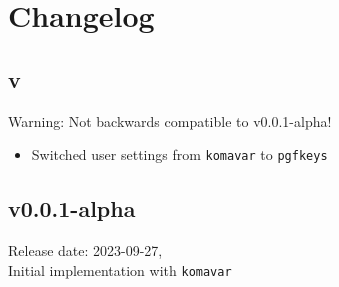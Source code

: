 \chapter{Changelog}
\section{v\releaseVersion}
Warning: Not backwards compatible to v0.0.1-alpha!
\begin{itemize}
	\item Switched user settings from \verb|komavar| to \verb|pgfkeys|
\end{itemize}

\section{v0.0.1-alpha}
	Release date: 2023-09-27,\\
	Initial implementation with \verb|komavar|